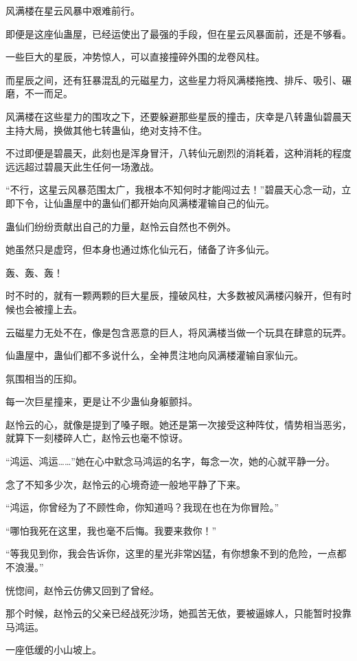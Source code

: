 \begin{this_body}
风满楼在星云风暴中艰难前行。

即便是这座仙蛊屋，已经运使出了最强的手段，但在星云风暴面前，还是不够看。

一些巨大的星辰，冲势惊人，可以直接撞碎外围的龙卷风柱。

而星辰之间，还有狂暴混乱的元磁星力，这些星力将风满楼拖拽、排斥、吸引、碾磨，不一而足。

风满楼在这些星力的围攻之下，还要躲避那些星辰的撞击，庆幸是八转蛊仙碧晨天主持大局，换做其他七转蛊仙，绝对支持不住。

不过即便是碧晨天，此刻也是浑身冒汗，八转仙元剧烈的消耗着，这种消耗的程度远远超过碧晨天此生任何一场激战。

“不行，这星云风暴范围太广，我根本不知何时才能闯过去！”碧晨天心念一动，立即下令，让仙蛊屋中的蛊仙们都开始向风满楼灌输自己的仙元。

蛊仙们纷纷贡献出自己的力量，赵怜云自然也不例外。

她虽然只是虚窍，但本身也通过炼化仙元石，储备了许多仙元。

轰、轰、轰！

时不时的，就有一颗两颗的巨大星辰，撞破风柱，大多数被风满楼闪躲开，但有时候也会被撞上去。

云磁星力无处不在，像是包含恶意的巨人，将风满楼当做一个玩具在肆意的玩弄。

仙蛊屋中，蛊仙们都不多说什么，全神贯注地向风满楼灌输自家仙元。

氛围相当的压抑。

每一次巨星撞来，更是让不少蛊仙身躯颤抖。

赵怜云的心，就像是提到了嗓子眼。她还是第一次接受这种阵仗，情势相当恶劣，就算下一刻楼碎人亡，赵怜云也毫不惊讶。

“鸿运、鸿运……”她在心中默念马鸿运的名字，每念一次，她的心就平静一分。

念了不知多少次，赵怜云的心境奇迹一般地平静了下来。

“鸿运，你曾经为了不顾性命，你知道吗？我现在也在为你冒险。”

“哪怕我死在这里，我也毫不后悔。我要来救你！”

“等我见到你，我会告诉你，这里的星光非常凶猛，有你想象不到的危险，一点都不浪漫。”

恍惚间，赵怜云仿佛又回到了曾经。

那个时候，赵怜云的父亲已经战死沙场，她孤苦无依，要被逼嫁人，只能暂时投靠马鸿运。

一座低缓的小山坡上。


\end{this_body}
